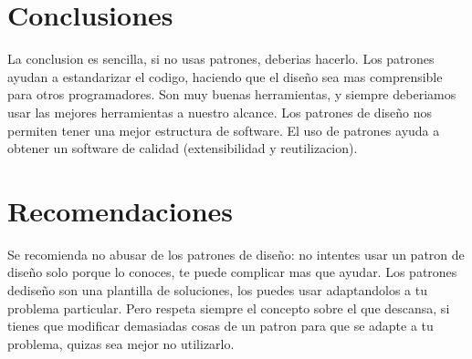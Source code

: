 \documentclass[twoside,twocolumn]{article}
\begin{document}
\section{Conclusiones}

La conclusion es sencilla, si no usas patrones, deberias hacerlo. Los patrones ayudan a estandarizar el codigo, haciendo que el diseño sea mas comprensible para otros programadores. Son muy buenas herramientas, y siempre deberiamos usar las mejores herramientas a nuestro alcance. Los patrones de diseño nos permiten tener una mejor estructura de software. El uso de patrones ayuda a obtener un software de calidad (extensibilidad y reutilizacion).

\section{Recomendaciones}
Se recomienda no abusar de los patrones de diseño: no intentes usar un patron de diseño solo porque lo conoces, te puede complicar mas que ayudar. Los patrones dediseño son una plantilla de soluciones, los puedes usar adaptandolos a tu problema particular. Pero respeta siempre el concepto sobre el que descansa, si tienes que modificar demasiadas cosas de un patron para que se adapte a tu problema, quizas sea mejor no utilizarlo.
\end{document}
